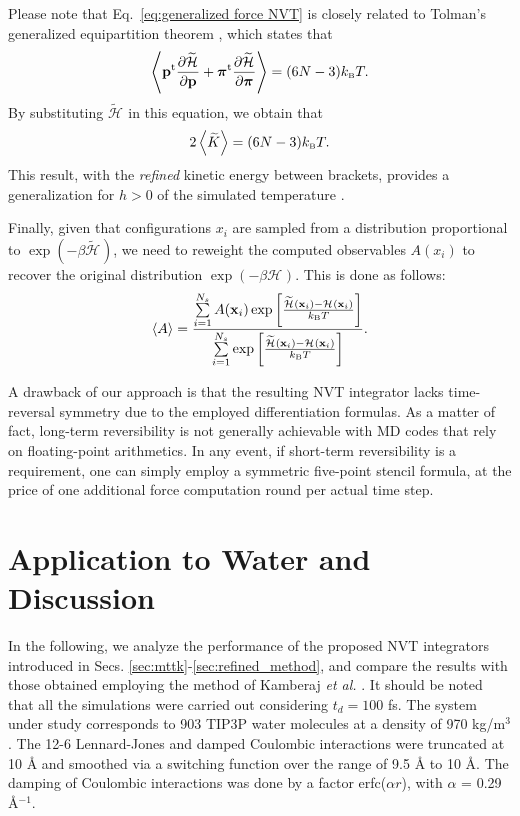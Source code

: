 \documentclass[
journal=jctcce,
layout=twocolumn
]{achemso}
\newcommand{\vt}[1]{\boldsymbol{\mathbf{#1}}}   %
\newcommand{\tr}[1]{#1^\text{t}}                %
\newcommand{\diff}[2]{\frac{\partial #1}{\partial #2}} %
\newcommand{\Ham}[1]{{\mathcal H}_\text{#1}}    %
\newcommand{\modified}[1]{\widetilde{#1}}
\begin{document}
Please note that Eq.~\ref{eq:generalized force NVT} is closely related to Tolman's generalized equipartition theorem \cite{Uline_2008}, which states that
\begin{equation*}
\left\langle \tr{\vt p} \diff{\modified{\Ham{}}}{\vt p} + \tr{\vt \pi} \diff{\modified{\Ham{}}}{\vt \pi} \right\rangle = (6N - 3) k_\text{\tiny B} T.
\end{equation*}
By substituting $\modified{\Ham{}}$ in this equation, we obtain that
\begin{equation}
2\left\langle \modified{K} \right\rangle = (6N - 3) k_\text{\tiny B} T.
\end{equation}
This result, with the \textit{refined} kinetic energy between brackets, provides a generalization for $h > 0$ of the simulated temperature \cite{Eastwood_2010}.

Finally, given that configurations $x_i$ are sampled from a distribution proportional to $\exp(-\beta \modified{\Ham{}})$, we need to reweight the computed observables $A(x_i)$ to recover the original distribution $\exp (-\beta \Ham{})$.
This is done as follows:
\begin{equation}
\label{eq:reweighting}
\langle A \rangle = \frac{\sum\limits_{i=1}^{N_s} A(\vt x_i) \exp \left[{\frac{\modified{\Ham{}}(\vt x_i) - {\Ham{}}(\vt x_i)}{k_\text{\tiny B} T}}\right]}{\sum\limits_{i=1}^{N_s} \exp \left[{\frac{\modified{\Ham{}}(\vt x_i) - {\Ham{}}(\vt x_i)}{k_\text{\tiny B} T}}\right] }.
\end{equation}

A drawback of our approach is that the resulting NVT integrator lacks time-reversal symmetry due to the employed differentiation formulas.
As a matter of fact, long-term reversibility is not generally achievable with MD codes that rely on floating-point arithmetics.
In any event, if short-term reversibility is a requirement, one can simply employ a symmetric five-point stencil formula, at the price of one additional force computation round per actual time step.

\section{Application to Water and Discussion}
\label{sec:numerical_results}

In the following, we analyze the performance of the proposed NVT integrators introduced in Secs. \ref{sec:mttk}-\ref{sec:refined_method}, and  compare the results with those obtained employing the method of Kamberaj \textit{et al.} \cite{Kamberaj_2005}.  It should be noted that all the simulations were carried out considering $t_d = 100$ fs.
The system under study corresponds to 903 TIP3P\cite{Jorgensen_1983} water molecules at a density of 970 kg/m$^3$.
The 12-6 Lennard-Jones and damped Coulombic interactions were truncated at  10 {\AA} and smoothed via a switching function over the range of 9.5 {\AA} to  10 {\AA}.\cite{Silveira_2017} 
The damping of Coulombic interactions was done by a factor erfc($\alpha r$), with $\alpha$ = 0.29 {\AA}$^{-1}$.
\end{document}

